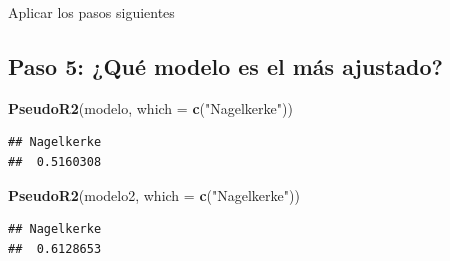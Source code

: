 \documentclass[
]{article}
\newenvironment{Shaded}{\begin{snugshade}}{\end{snugshade}}
\newcommand{\AttributeTok}[1]{\textcolor[rgb]{0.13,0.29,0.53}{#1}}
\newcommand{\FunctionTok}[1]{\textcolor[rgb]{0.13,0.29,0.53}{\textbf{#1}}}
\newcommand{\NormalTok}[1]{#1}
\newcommand{\StringTok}[1]{\textcolor[rgb]{0.31,0.60,0.02}{#1}}
\begin{document}
Aplicar los pasos siguientes

\hypertarget{paso-5-quuxe9-modelo-es-el-muxe1s-ajustado}{%
\subsection{\texorpdfstring{\textbf{Paso 5: ¿Qué modelo es el más
ajustado?}}{Paso 5: ¿Qué modelo es el más ajustado?}}\label{paso-5-quuxe9-modelo-es-el-muxe1s-ajustado}}

\begin{Shaded}
\begin{Highlighting}[]
\FunctionTok{PseudoR2}\NormalTok{(modelo, }\AttributeTok{which =} \FunctionTok{c}\NormalTok{(}\StringTok{"Nagelkerke"}\NormalTok{))}
\end{Highlighting}
\end{Shaded}

\begin{verbatim}
## Nagelkerke 
##  0.5160308
\end{verbatim}

\begin{Shaded}
\begin{Highlighting}[]
\FunctionTok{PseudoR2}\NormalTok{(modelo2, }\AttributeTok{which =} \FunctionTok{c}\NormalTok{(}\StringTok{"Nagelkerke"}\NormalTok{))}
\end{Highlighting}
\end{Shaded}

\begin{verbatim}
## Nagelkerke 
##  0.6128653
\end{verbatim}
\end{document}
